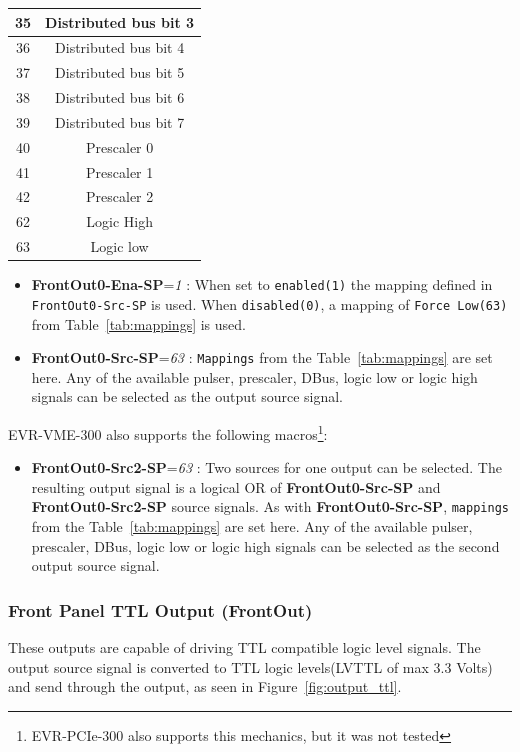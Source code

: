 \documentclass[12pt,a4paper]{article}
\begin{document}
\begin{table}[!hbt]
\begin{tabular}{|c|c|}
		\hline 35 & Distributed bus bit 3 \\ 
		\hline 36 & Distributed bus bit 4 \\ 
		\hline 37 & Distributed bus bit 5 \\ 
		\hline 38 & Distributed bus bit 6 \\ 
		\hline 39 & Distributed bus bit 7 \\ 
		\hline 40 & Prescaler 0 \\ 
		\hline 41 & Prescaler 1 \\ 
		\hline 42 & Prescaler 2 \\ 
		\hline 62 & Logic High \\ 
		\hline 63 & Logic low \\ 
		\hline 
	\end{tabular} 
\end{table}

  \begin{itemize}
  \item
   \textbf{FrontOut0-Ena-SP}=\emph{1} : When set to \texttt{enabled(1)} the mapping
    defined in \texttt{FrontOut0-Src-SP} is used. When \texttt{disabled(0)}, a
    mapping of \texttt{Force Low(63)} from Table~\ref{tab:mappings} is used.
  \item
    \textbf{FrontOut0-Src-SP}=\emph{63} : \texttt{Mappings} from the Table~\ref{tab:mappings} are
    set here. Any of the available pulser, prescaler, DBus, logic low or
    logic high signals can be selected as the output source signal.
  \end{itemize}
EVR-VME-300 also supports the following macros\footnote{EVR-PCIe-300 also supports this mechanics, but it was not tested}:
\begin{itemize}
  \item
    \textbf{FrontOut0-Src2-SP}=\emph{63} : Two sources for one output can be selected. The resulting output signal is a logical OR of \textbf{FrontOut0-Src-SP} and \textbf{FrontOut0-Src2-SP} source signals. As with \textbf{FrontOut0-Src-SP}, \texttt{mappings} from the Table~\ref{tab:mappings} are set here. Any of the available pulser, prescaler, DBus, logic low or logic high signals can be selected as the second output source signal.
  \end{itemize}
  
\subsubsection{Front Panel TTL Output (FrontOut)}\label{sec:Front Panel TTL Output}
These outputs are capable of driving TTL compatible logic level signals. The output source signal is converted to TTL logic levels(LVTTL of max 3.3 Volts) and send through the output, as seen in Figure~\ref{fig:output_ttl}.
\end{document}
